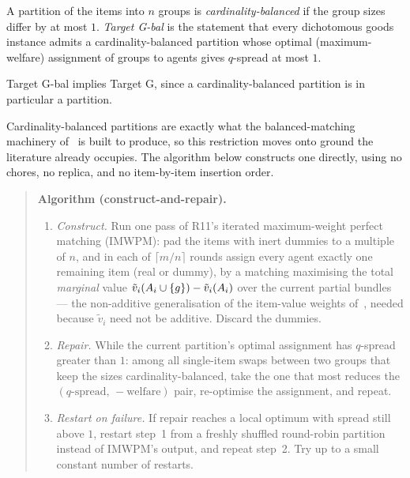 \begin{definition}
\label{def:targetGbal}
A partition of the items into $n$ groups is \emph{cardinality-balanced} if the
group sizes differ by at most $1$. \emph{Target G-bal} is the statement that
every dichotomous goods instance admits a cardinality-balanced partition whose
optimal (maximum-welfare) assignment of groups to agents gives $q$-spread at
most $1$.
\end{definition}

\begin{observation}
\label{obs:Gbal-implies-G}
Target G-bal implies Target G, since a cardinality-balanced partition is in
particular a partition.
\end{observation}

Cardinality-balanced partitions are exactly what the balanced-matching
machinery of~\cite{BDNSV20,LMS26} is built to produce, so this restriction moves
onto ground the literature already occupies. The algorithm below constructs one
directly, using no chores, no replica, and no item-by-item insertion order.

\begin{quote}
\textbf{Algorithm (construct-and-repair).}
\begin{enumerate}
  \item[1.] \emph{Construct.} Run one pass of R11's iterated maximum-weight
    perfect matching (IMWPM): pad the items with inert dummies to a multiple of
    $n$, and in each of $\lceil m/n \rceil$ rounds assign every agent exactly
    one remaining item (real or dummy), by a matching maximising the total
    \emph{marginal} value $\tilde{v}_i(A_{i} \cup \left\{g\right\}) -
    \tilde{v}_i(A_{i})$ over the current partial bundles --- the
    non-additive generalisation of the item-value weights of~\cite{BDNSV20},
    needed because $\tilde{v}_i$ need not be additive. Discard the dummies.
  \item[2.] \emph{Repair.} While the current partition's optimal assignment has
    $q$-spread greater than $1$: among all single-item swaps between two groups
    that keep the sizes cardinality-balanced, take the one that most reduces
    the $(q\text{-spread},\, -\text{welfare})$ pair, re-optimise the assignment,
    and repeat.
  \item[3.] \emph{Restart on failure.} If repair reaches a local optimum with
    spread still above $1$, restart step~1 from a freshly shuffled round-robin
    partition instead of IMWPM's output, and repeat step~2. Try up to a small
    constant number of restarts.
\end{enumerate}
\end{quote}

